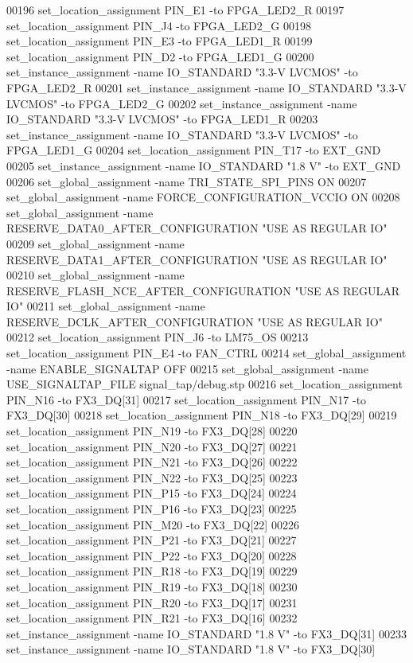 \begin{DoxyCode}
00196 set\_location\_assignment PIN\_E1 -to FPGA\_LED2\_R
00197 set\_location\_assignment PIN\_J4 -to FPGA\_LED2\_G
00198 set\_location\_assignment PIN\_E3 -to FPGA\_LED1\_R
00199 set\_location\_assignment PIN\_D2 -to FPGA\_LED1\_G
00200 set\_instance\_assignment -name IO\_STANDARD "3.3-V LVCMOS" -to FPGA\_LED2\_R
00201 set\_instance\_assignment -name IO\_STANDARD "3.3-V LVCMOS" -to FPGA\_LED2\_G
00202 set\_instance\_assignment -name IO\_STANDARD "3.3-V LVCMOS" -to FPGA\_LED1\_R
00203 set\_instance\_assignment -name IO\_STANDARD "3.3-V LVCMOS" -to FPGA\_LED1\_G
00204 set\_location\_assignment PIN\_T17 -to EXT\_GND
00205 set\_instance\_assignment -name IO\_STANDARD "1.\textcolor{vhdllogic}{8} V" -to EXT\_GND
00206 set\_global\_assignment -name TRI\_STATE\_SPI\_PINS \textcolor{keywordflow}{ON}
00207 set\_global\_assignment -name FORCE\_CONFIGURATION\_VCCIO \textcolor{keywordflow}{ON}
00208 set\_global\_assignment -name RESERVE\_DATA0\_AFTER\_CONFIGURATION "USE AS REGULAR IO"
00209 set\_global\_assignment -name RESERVE\_DATA1\_AFTER\_CONFIGURATION "USE AS REGULAR IO"
00210 set\_global\_assignment -name RESERVE\_FLASH\_NCE\_AFTER\_CONFIGURATION "USE AS REGULAR IO"
00211 set\_global\_assignment -name RESERVE\_DCLK\_AFTER\_CONFIGURATION "USE AS REGULAR IO"
00212 set\_location\_assignment PIN\_J6 -to LM75\_OS
00213 set\_location\_assignment PIN\_E4 -to FAN\_CTRL
00214 set\_global\_assignment -name ENABLE\_SIGNALTAP OFF
00215 set\_global\_assignment -name USE\_SIGNALTAP\_FILE signal\_tap/debug.stp
00216 set\_location\_assignment PIN\_N16 -to FX3\_DQ[31]
00217 set\_location\_assignment PIN\_N17 -to FX3\_DQ[30]
00218 set\_location\_assignment PIN\_N18 -to FX3\_DQ[29]
00219 set\_location\_assignment PIN\_N19 -to FX3\_DQ[28]
00220 set\_location\_assignment PIN\_N20 -to FX3\_DQ[27]
00221 set\_location\_assignment PIN\_N21 -to FX3\_DQ[26]
00222 set\_location\_assignment PIN\_N22 -to FX3\_DQ[25]
00223 set\_location\_assignment PIN\_P15 -to FX3\_DQ[24]
00224 set\_location\_assignment PIN\_P16 -to FX3\_DQ[23]
00225 set\_location\_assignment PIN\_M20 -to FX3\_DQ[22]
00226 set\_location\_assignment PIN\_P21 -to FX3\_DQ[21]
00227 set\_location\_assignment PIN\_P22 -to FX3\_DQ[20]
00228 set\_location\_assignment PIN\_R18 -to FX3\_DQ[19]
00229 set\_location\_assignment PIN\_R19 -to FX3\_DQ[18]
00230 set\_location\_assignment PIN\_R20 -to FX3\_DQ[17]
00231 set\_location\_assignment PIN\_R21 -to FX3\_DQ[16]
00232 set\_instance\_assignment -name IO\_STANDARD "1.\textcolor{vhdllogic}{8} V" -to FX3\_DQ[31]
00233 set\_instance\_assignment -name IO\_STANDARD "1.\textcolor{vhdllogic}{8} V" -to FX3\_DQ[30]

\end{DoxyCode}
